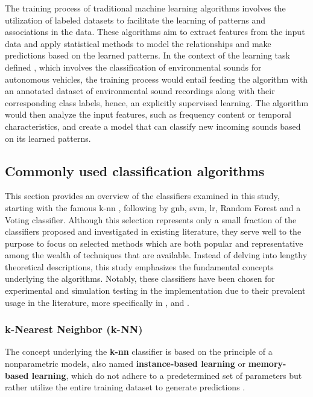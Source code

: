 The training process of traditional machine learning algorithms involves the utilization of labeled datasets to facilitate the learning of patterns and associations in the data. These algorithms aim to extract features from the input data and apply statistical methods to model the relationships and make predictions based on the learned patterns. In the context of the learning task defined \cite{Mitchell1997}, which involves the classification of environmental sounds for autonomous vehicles, the training process would entail feeding the algorithm with an annotated dataset of environmental sound recordings along with their corresponding class labels, hence, an explicitly supervised learning. The algorithm would then analyze the input features, such as frequency content or temporal characteristics, and create a model that can classify new incoming sounds based on its learned patterns.


\subsection{Commonly used classification algorithms}
\label{subsec:machine_learning_common_classification}

This section provides an overview of the classifiers examined in this study, starting with the famous \gls{k-nn} , following by \gls{gnb}, \gls{svm}, \gls{lr}, Random Forest and a Voting classifier.  Although this selection represents only a small fraction of the classifiers proposed and investigated in existing literature, they serve well to the purpose to focus on selected methods which are both popular and representative among the wealth of techniques that are available. Instead of delving into lengthy theoretical descriptions, this study emphasizes the fundamental concepts underlying the algorithms. Notably, these classifiers have been chosen for experimental and simulation testing in the implementation due to their prevalent usage in the literature, more specifically in \textcite{Bountourakis2015}, \textcite{Silva2019} and \textcite{Lhoest2021}.


\subsubsection{k-Nearest Neighbor (k-NN)}
\label{subsubsec:machine_learning_k-NN}

The concept underlying the \textbf{\gls{k-nn}} classifier is based on the principle of a nonparametric models, also named \textbf{instance-based learning} or \textbf{memory-based learning}, which do not adhere to a predetermined set of parameters but rather utilize the entire training dataset to generate predictions \cite{Russel2010}. 


